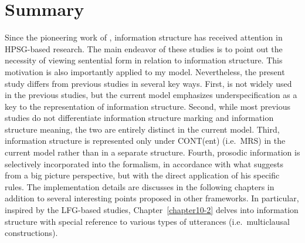 \section{Summary}
\label{8:ssec:summary}

Since the pioneering work of \citet{engdahl:vallduvi:96}, information
structure has received attention in HPSG-based research.  The main
endeavor of these studies is to point out the necessity of viewing
sentential form in relation to information structure. This motivation
is also importantly applied to my model. Nevertheless, the present
study differs from previous studies in several key ways. First,
 is not widely used in the previous studies,
but the current model emphasizes underspecification as a key to the
representation of information structure. Second, while most previous
studies do not differentiate information structure marking and
information structure meaning, the two are entirely distinct in the
current model. Third, information structure is represented only under
CONT(ent) (i.e.\ MRS) in the current model rather than in a
separate structure. Fourth, prosodic information is selectively
incorporated into the formalism, in accordance with what
\citet{bildhauer:07} suggests from a big picture perspective, but with
the direct application of his specific rules.  The implementation
details are discusses in the following chapters in addition to several
interesting points proposed in other frameworks. In particular,
inspired by the LFG-based studies, Chapter~\ref{chapter10-2} delves
into information structure with special reference to various types of
utterances (i.e.\ multiclausal constructions).

